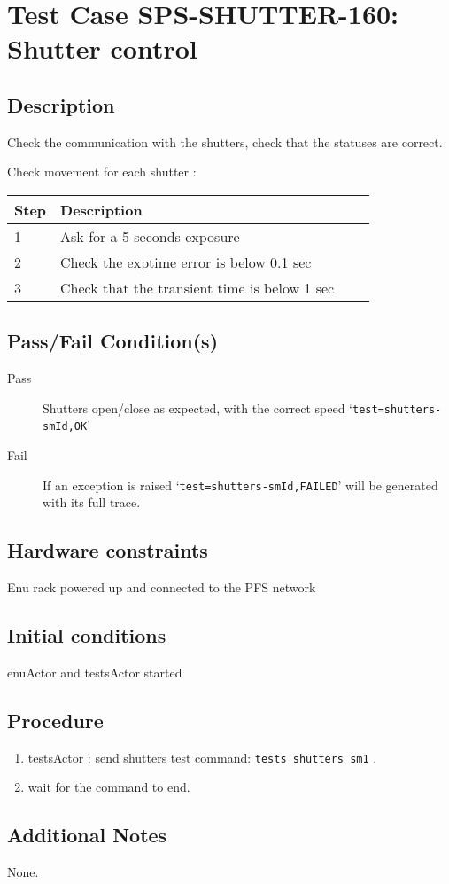 \section{Test Case SPS-SHUTTER-160: Shutter control}

\subsection{Description}

Check the communication with the shutters, check that the statuses are correct.

Check movement for each shutter :
\begin{table}[H]
    \begin{tabular}{|l| p{10cm} |l| p{10cm} |}
    \hline
    {\bf Step} & {\bf Description}   \\ \hline
    1 & Ask for a 5 seconds exposure     \\ \hline
    2 & Check the exptime error is below 0.1 sec     \\ \hline
    3 & Check that the transient time is below 1 sec     \\ \hline
    \end{tabular}
\end{table}


\subsection{Pass/Fail Condition(s)}

\begin{description}
\item [Pass] Shutters open/close as expected, with the correct speed `\texttt{test=shutters-smId,OK}'
\item [Fail] If an exception is raised `\texttt{test=shutters-smId,FAILED}' will be generated with its full trace.
\end{description}

\subsection{Hardware constraints}

Enu rack powered up and connected to the PFS network

\subsection{Initial conditions}
enuActor and testsActor started

\subsection{Procedure}

\begin{enumerate}
    \item testsActor : send shutters test command: \texttt{tests shutters sm1} .
    \item wait for the command to end.
\end{enumerate}



\subsection{Additional Notes}

None.
